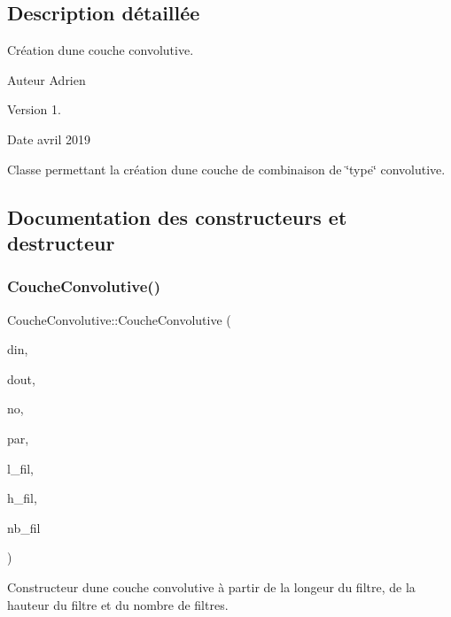 \subsection{Description détaillée}
Création d\textquotesingle{}une couche convolutive. 

\begin{DoxyAuthor}{Auteur}
Adrien 
\end{DoxyAuthor}
\begin{DoxyVersion}{Version}
1. 
\end{DoxyVersion}
\begin{DoxyDate}{Date}
avril 2019
\end{DoxyDate}
Classe permettant la création d\textquotesingle{}une couche de combinaison de \char`\"{}type\char`\"{} convolutive. 

\subsection{Documentation des constructeurs et destructeur}
\mbox{\label{classCoucheConvolutive_ac0e9fc1269646ff46ab9ea2a26489123}} 
\subsubsection{\texorpdfstring{Couche\+Convolutive()}{CoucheConvolutive()}}
{\footnotesize\ttfamily Couche\+Convolutive\+::\+Couche\+Convolutive (\begin{DoxyParamCaption}\item[{\hyperlink{classDimTenseur}{Dim\+Tenseur}}]{din,  }\item[{\hyperlink{classDimTenseur}{Dim\+Tenseur}}]{dout,  }\item[{std\+::string}]{no,  }\item[{\hyperlink{classTenseur}{Tenseur}}]{par,  }\item[{int}]{l\+\_\+fil,  }\item[{int}]{h\+\_\+fil,  }\item[{int}]{nb\+\_\+fil }\end{DoxyParamCaption})}



Constructeur d\textquotesingle{}une couche convolutive à partir de la longeur du filtre, de la hauteur du filtre et du nombre de filtres. 

